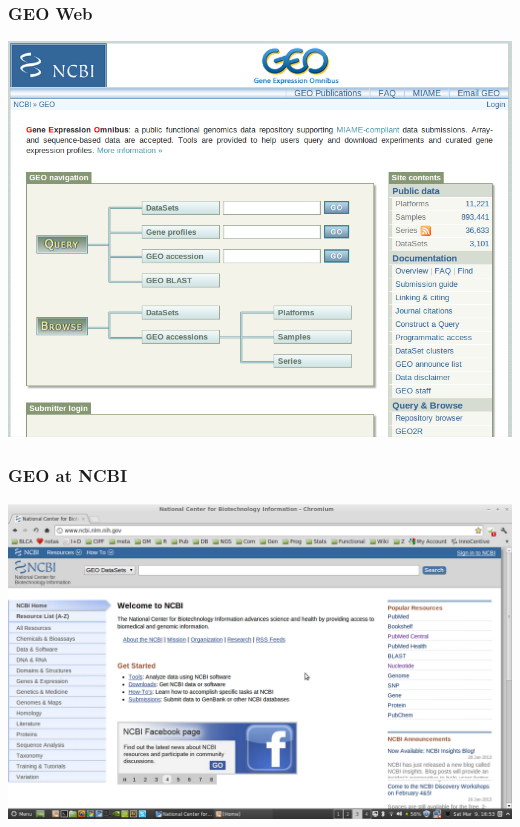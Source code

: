\documentclass{beamer}
\begin{document}
\begin{frame}
  \frametitle{GEO Web}
  
  \begin{center}
    \href{http://www.ncbi.nlm.nih.gov/geo/}{\includegraphics[width=\linewidth]{geo1}}
  \end{center}

\end{frame}


\begin{frame}
  \frametitle{GEO at NCBI}
  
  \begin{center}
    \href{http://www.ncbi.nlm.nih.gov}{\includegraphics[width=\linewidth]{ncbi1}}
  \end{center}

\end{frame}
\end{document}
